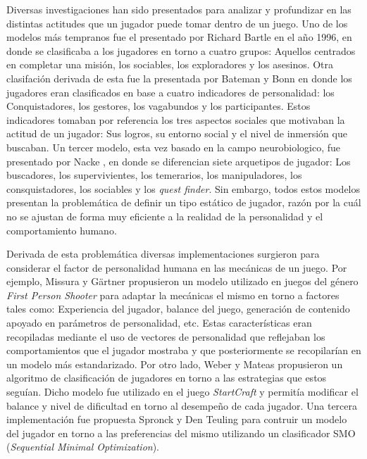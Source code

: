 \documentclass[conference]{IEEEtran}
\begin{document}
Diversas investigaciones han sido presentados para analizar y profundizar en las distintas actitudes que un jugador puede tomar dentro de un juego. Uno de los modelos más tempranos fue el presentado por Richard Bartle \citep{bartle1996hearts} en el año 1996, en donde se clasificaba a los jugadores en torno a cuatro grupos: Aquellos centrados en completar una misión, los sociables,  los exploradores y los asesinos. Otra clasifación derivada de esta fue la presentada por Bateman y Bonn \citep{bateman200521st} en donde los jugadores eran clasificados en base a cuatro indicadores de personalidad: los Conquistadores, los gestores, los vagabundos y los participantes. Estos indicadores tomaban por referencia los tres aspectos sociales que motivaban la actitud de un jugador: Sus logros, su entorno social y el nivel de inmersión que buscaban. Un tercer modelo, esta vez basado en la campo neurobiologico, fue presentado por Nacke \citep{nacke2014brainhex}, en donde se diferencian siete arquetipos de jugador: Los buscadores, los supervivientes, los temerarios, los manipuladores, los consquistadores, los sociables y los \textit{quest finder}. Sin embargo, todos estos modelos presentan la problemática de definir un tipo estático de jugador, razón por la cuál no se ajustan de forma muy eficiente a la realidad de la personalidad y el comportamiento humano. 	

Derivada de esta problemática diversas implementaciones surgieron para considerar el factor de personalidad humana en las mecánicas de un juego. Por ejemplo, Missura y Gärtner \citep{missura2009player} propusieron un modelo utilizado en juegos del género \textit{First Person Shooter} para adaptar la mecánicas el mismo en torno a factores tales como: Experiencia del jugador, balance del juego, generación de contenido apoyado en parámetros de personalidad, etc. Estas características eran recopiladas mediante el uso de vectores de personalidad que reflejaban los comportamientos que el jugador mostraba y que posteriormente se recopilarían en un modelo más estandarizado. Por otro lado, Weber y Mateas \citep{weber2009data} propusieron un algoritmo de clasificación de jugadores en torno a las estrategias que estos seguían. Dicho modelo fue utilizado en el juego \textit{StartCraft} y permitía modificar el balance y nivel de dificultad en torno al desempeño de cada jugador. Una tercera implementación fue propuesta Spronck y Den Teuling \citep{spronck2010player} para contruir un modelo del jugador en torno a las preferencias del mismo utilizando un clasificador SMO (\textit{Sequential Minimal Optimization}).
\end{document}
